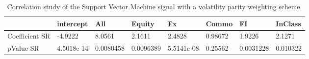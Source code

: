 \begin{table}[H]
\centering
\begin{tabular}{llllllll}
& intercept & All & Equity & Fx & Commo & FI & InClass \\ 
\hline 
Coefficient SR & -4.9222 & 8.0561 & 2.1611 & 2.4828 & 0.98672 & 1.9226 & 2.1271 \\ 
pValue SR & 4.5018e-14 & 0.0080458 & 0.0096389 & 5.5141e-08 & 0.25562 & 0.0031228 & 0.010322 \\ 
\hline
\end{tabular}
\caption{Correlation study of the Support Vector Machine signal with a volatility parity weighting scheme.}
\label{SVM_VP_CORR}
\end{table}